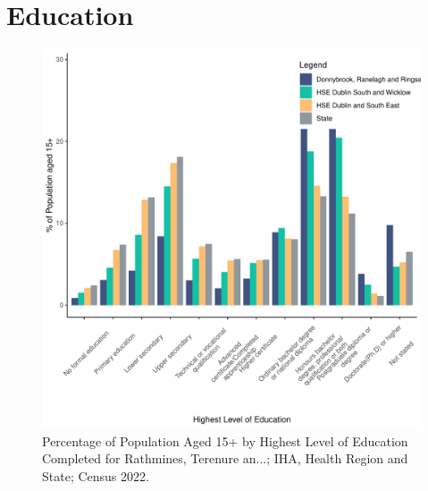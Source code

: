 \documentclass{article}
\begin{document}
\section{Education}\label{sect:Edu}
\begin{figure}[H]
	\centering
	\includegraphics[width = 120mm]{../figures/EduED.pdf}
	\caption{Percentage of Population Aged 15+ by Highest Level of Education Completed for Rathmines, Terenure an...; IHA, Health Region and State; Census 2022.}
	\label{fig:vbnv}
	\end{figure}
\end{document}
